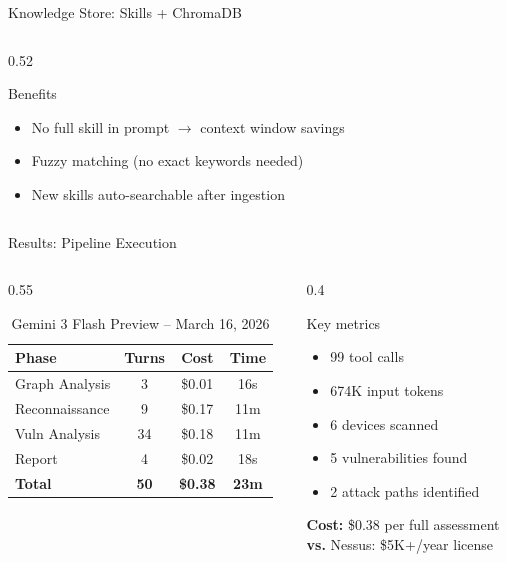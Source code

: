\documentclass[aspectratio=169]{beamer}
\begin{document}
\begin{frame}{Knowledge Store: Skills + ChromaDB}
\begin{columns}[T]
\begin{column}{0.52\textwidth}
\vspace{0.1cm}
\begin{block}{Benefits}
\footnotesize
\begin{itemize}
    \item No full skill in prompt $\rightarrow$ context window savings
    \item Fuzzy matching (no exact keywords needed)
    \item New skills auto-searchable after ingestion
\end{itemize}
\end{block}
\end{column}
\end{columns}
\end{frame}

\begin{frame}{Results: Pipeline Execution}

\begin{columns}[T]
\begin{column}{0.55\textwidth}
\begin{table}
\centering
\small
\begin{tabular}{@{}lccc@{}}
\toprule
\textbf{Phase} & \textbf{Turns} & \textbf{Cost} & \textbf{Time} \\
\midrule
Graph Analysis & 3 & \$0.01 & 16s \\
Reconnaissance & 9 & \$0.17 & 11m \\
Vuln Analysis & 34 & \$0.18 & 11m \\
Report & 4 & \$0.02 & 18s \\
\midrule
\textbf{Total} & \textbf{50} & \textbf{\$0.38} & \textbf{23m} \\
\bottomrule
\end{tabular}
\caption*{\small Gemini 3 Flash Preview -- March 16, 2026}
\end{table}
\end{column}

\begin{column}{0.4\textwidth}
\begin{block}{Key metrics}
\begin{itemize}
    \item 99 tool calls
    \item 674K input tokens
    \item 6 devices scanned
    \item 5 vulnerabilities found
    \item 2 attack paths identified
\end{itemize}
\end{block}

\vspace{0.2cm}
\textbf{Cost:} \$0.38 per full assessment\\
\textbf{vs.} Nessus: \$5K+/year license
\end{column}
\end{columns}
\end{frame}
\end{document}
